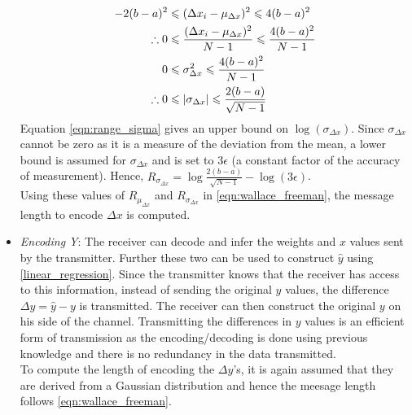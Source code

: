\documentclass[a4paper,12pt]{article}
\begin{document}
\begin{itemize}
 \begin{align}
  -2 (b-a)^2 & \leqslant (\Delta x_i - \mu_{\Delta x})^2 \leqslant 4 (b-a)^2 \notag\\
  \therefore 0 & \leqslant \frac{(\Delta x_i - \mu_{\Delta x})^2}{N-1} \leqslant \frac{4 (b-a)^2}{N-1} \notag\\
  0 & \leqslant \sigma_{\Delta x}^2 \leqslant \frac{4 (b-a)^2}{N-1} \notag\\
  \therefore 0 & \leqslant |\sigma_{\Delta x}| \leqslant \frac{2(b-a)}{\sqrt{N-1}} \label{eqn:range_sigma} 
 \end{align}
Equation \eqref{eqn:range_sigma} gives an upper bound on $\log(\sigma_{\Delta x})$. Since $\sigma_{\Delta x}$ cannot be zero as it is a measure of the deviation from the mean, a lower bound is assumed for $\sigma_{\Delta x}$ and is set to $3\epsilon$ (a constant factor of the accuracy of measurement). Hence, $R_{\sigma_{\Delta x}} = \log\frac{2(b-a)}{\sqrt{N-1}}-\log(3\epsilon)$. \\

Using these values of $R_{\mu_{\Delta x}}$ and $R_{\sigma_{\Delta x}}$ in \eqref{eqn:wallace_freeman}, the message length to encode $\Delta x$ is computed.

\item \textit{Encoding Y}: The receiver can decode and infer the weights and $x$ values sent by the transmitter. Further these two can be used to construct $\hat{y}$ using \eqref{linear_regression}. Since the transmitter knows that the receiver has access to this information, instead of sending the original $y$ values, the difference $\Delta y = \hat{y}-y$ is transmitted. The receiver can then construct the original $y$ on his side of the channel. Transmitting the differences in $y$ values is an efficient form of transmission as the encoding/decoding is done using previous knowledge and there is no redundancy in the data transmitted. \\

To compute the length of encoding the $\Delta y$'s, it is again assumed that they are derived from a Gaussian distribution and hence the meesage length follows \eqref{eqn:wallace_freeman}. 	
 
\end{itemize}
\end{document}
